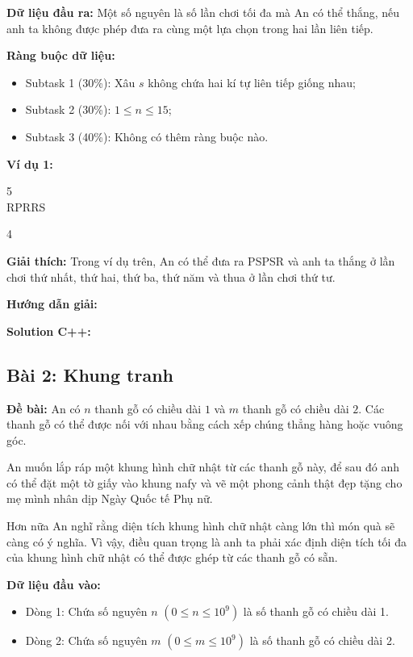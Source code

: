 \documentclass[12pt]{scrartcl}  %
\begin{document}
\textbf{Dữ liệu đầu ra:}
Một số nguyên là số lần chơi tối đa mà An có thể thắng, nếu anh ta không được phép đưa ra cùng một lựa chọn trong hai lần liên tiếp.

\textbf{Ràng buộc dữ liệu:}
\begin{itemize}
    \item Subtask 1 (30\%): Xâu $s$ không chứa hai kí tự liên tiếp giống nhau;
    \item Subtask 2 (30\%): $1 \leq n \leq 15$;
    \item Subtask 3 (40\%): Không có thêm ràng buộc nào.
\end{itemize}

\textbf{Ví dụ 1:}
\begin{tcolorbox}[colback=gray!5!white, colframe=blue!50!black, title=Input]
5\\
RPRRS
\end{tcolorbox}
\begin{tcolorbox}[colback=gray!5!white, colframe=green!50!black, title=Output]
4
\end{tcolorbox}

\textbf{Giải thích:}
Trong ví dụ trên, An có thể đưa ra PSPSR và anh ta thắng ở lần chơi thứ nhất, thứ hai, thứ ba, thứ năm và thua ở lần chơi thứ tư.

\textbf{Hướng dẫn giải:}

\textbf{Solution C++:}

\subsection{Bài 2: Khung tranh}
\textbf{Đề bài:}
An có $n$ thanh gỗ có chiều dài $1$ và $m$ thanh gỗ có chiều dài $2$. Các thanh gỗ có thể được nối với nhau bằng cách xếp chúng thẳng hàng hoặc vuông góc.

An muốn lắp ráp một khung hình chữ nhật từ các thanh gỗ này, để sau đó anh có thể đặt một tờ giấy vào khung nafy và vẽ một phong cảnh thật đẹp tặng cho mẹ mình nhân dịp Ngày Quốc tế Phụ nữ.

Hơn nữa An nghĩ rằng diện tích khung hình chữ nhật càng lớn thì món quà sẽ càng có ý nghĩa. Vì vậy, điều quan trọng là anh ta phải xác định diện tích tối đa của khung hình chữ nhật có thể được ghép từ các thanh gỗ có sẵn.

\textbf{Dữ liệu đầu vào:}
\begin{itemize}
    \item Dòng 1: Chứa số nguyên $n$ $(0 \leq n \leq 10^9)$ là số thanh gỗ có chiều dài 1.
    \item Dòng 2: Chứa số nguyên $m$ $(0 \leq m \leq 10^9)$ là số thanh gỗ có chiều dài 2.
\end{itemize}
\end{document}
